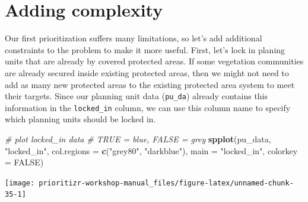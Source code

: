 \documentclass[
  12pt,
]{book}
\newenvironment{Shaded}{\begin{snugshade}}{\end{snugshade}}
\newcommand{\CommentTok}[1]{\textcolor[rgb]{0.56,0.35,0.01}{\textit{#1}}}
\newcommand{\DataTypeTok}[1]{\textcolor[rgb]{0.13,0.29,0.53}{#1}}
\newcommand{\FloatTok}[1]{\textcolor[rgb]{0.00,0.00,0.81}{#1}}
\newcommand{\KeywordTok}[1]{\textcolor[rgb]{0.13,0.29,0.53}{\textbf{#1}}}
\newcommand{\NormalTok}[1]{#1}
\newcommand{\OperatorTok}[1]{\textcolor[rgb]{0.81,0.36,0.00}{\textbf{#1}}}
\newcommand{\OtherTok}[1]{\textcolor[rgb]{0.56,0.35,0.01}{#1}}
\newcommand{\StringTok}[1]{\textcolor[rgb]{0.31,0.60,0.02}{#1}}
\begin{document}
\hypertarget{adding-complexity}{%
\section{Adding complexity}\label{adding-complexity}}

Our first prioritization suffers many limitations, so let's add additional constraints to the problem to make it more useful. First, let's lock in planing units that are already by covered protected areas. If some vegetation communities are already secured inside existing protected areas, then we might not need to add as many new protected areas to the existing protected area system to meet their targets. Since our planning unit data (\texttt{pu\_da}) already contains this information in the \texttt{locked\_in} column, we can use this column name to specify which planning units should be locked in.

\begin{Shaded}
\begin{Highlighting}[]
\CommentTok{# plot locked_in data}
\CommentTok{# TRUE = blue, FALSE = grey}
\KeywordTok{spplot}\NormalTok{(pu_data, }\StringTok{"locked_in"}\NormalTok{, }\DataTypeTok{col.regions =} \KeywordTok{c}\NormalTok{(}\StringTok{"grey80"}\NormalTok{, }\StringTok{"darkblue"}\NormalTok{),}
       \DataTypeTok{main =} \StringTok{"locked_in"}\NormalTok{, }\DataTypeTok{colorkey =} \OtherTok{FALSE}\NormalTok{)}
\end{Highlighting}
\end{Shaded}

\begin{center}\texttt{[image: prioritizr-workshop-manual\_files/figure-latex/unnamed-chunk-35-1]} \end{center}

\begin{Shaded}
\end{Shaded}
\end{document}
